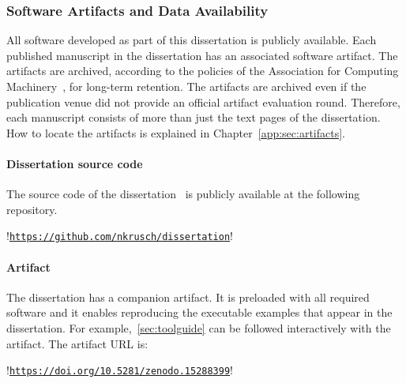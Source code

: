 \subsubsection{Software Artifacts and Data Availability}

All software developed as part of this dissertation is publicly available. Each
published manuscript in the dissertation has an associated software artifact.
The artifacts are archived, according to the policies of the Association for
Computing Machinery~\cite{acm_badging}, for long-term retention. The artifacts
are archived even if the publication venue did not provide an official artifact
evaluation round. Therefore, each manuscript consists of more than just the text
pages of the dissertation. How to locate the artifacts is explained
in Chapter~\autoref{app:sec:artifacts}.


\paragraph*{Dissertation source code}
The source code of the dissertation~\cite{diss} is publicly available at the
following repository.

\noindent\begin{minipage}{\textwidth}
\begin{browserlisting}[nolol,escapeinside=!!]
!\href{https://github.com/nkrusch/dissertation}
{\texttt{https://github.com/nkrusch/dissertation}}!
\end{browserlisting}
\end{minipage}

\paragraph*{Artifact}
The dissertation has a companion artifact. It is preloaded with all required
software and it enables reproducing the executable examples that appear in the
dissertation. For example,~\autoref{sec:toolguide} can be followed interactively
with the artifact. The artifact URL is:

\noindent\begin{minipage}{\textwidth}
\begin{browserlisting}[nolol,escapeinside=!!]
!\href{https://doi.org/10.5281/zenodo.15288399}
{\texttt{https://doi.org/10.5281/zenodo.15288399}}!
\end{browserlisting}
\end{minipage}

